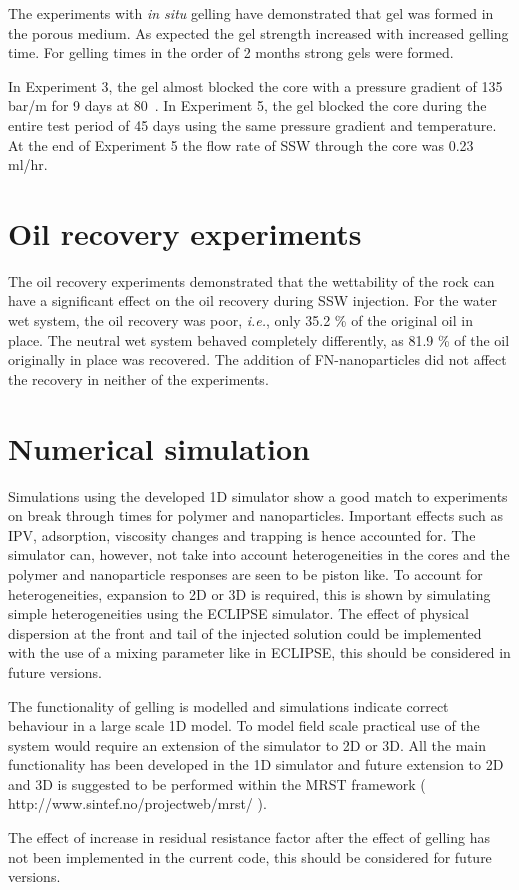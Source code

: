 The experiments with \textit{in situ} gelling have demonstrated that gel was formed in the porous medium. As expected the gel strength increased with increased gelling time. For gelling times in the order of 2 months strong gels were formed. 

In Experiment 3, the gel almost blocked the core with a pressure gradient of 135 bar/m for 9 days at 80~\celsius. In Experiment 5, the gel blocked the core during the entire test period of 45 days using the same pressure gradient and temperature. At the end of Experiment 5 the flow rate of SSW through the core was 0.23 ml/hr. 

\section{Oil recovery experiments}

The oil recovery experiments demonstrated that the wettability of the rock can have a significant effect on the oil recovery during SSW injection. For the water wet system, the oil recovery was poor, \textit{i.e.}, only 35.2 \% of the original oil in place. The neutral wet system behaved completely differently, as 81.9 \% of the oil originally in place was recovered. The addition of FN-nanoparticles did not affect the recovery in neither of the experiments.

\section{Numerical simulation}
Simulations using the developed 1D simulator show a good match to experiments on break through times for polymer and nanoparticles. Important effects such as IPV, adsorption, viscosity changes and trapping is hence accounted for. The simulator can, however, not take into account heterogeneities in the cores and the polymer and nanoparticle responses are seen to be piston like. To account for heterogeneities, expansion to 2D or 3D is required, this is shown by simulating simple heterogeneities using the ECLIPSE simulator. The effect of physical dispersion at the front and tail of the injected solution could be implemented with the use of a mixing parameter like in ECLIPSE, this should be considered in future versions. 

The functionality of gelling is modelled and simulations indicate correct behaviour in a large scale 1D model. To model field scale practical use of the system would require an extension of the simulator to 2D or 3D. All the main functionality has been developed in the 1D simulator and future extension to 2D and 3D is suggested to be performed within the MRST framework ( http://www.sintef.no/projectweb/mrst/ ).

The effect of increase in residual resistance factor after the effect of gelling has not been implemented in the current code, this should be considered for future versions.

